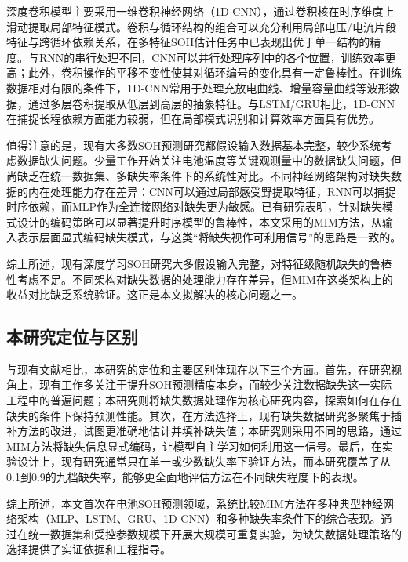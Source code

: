 \documentclass[10pt,a4paper]{ctexart}
\begin{document}
深度卷积模型主要采用一维卷积神经网络（1D-CNN），通过卷积核在时序维度上滑动提取局部特征模式\cite{zhang2024cnnsoh}。卷积与循环结构的组合可以充分利用局部电压/电流片段特征与跨循环依赖关系，在多特征SOH估计任务中已表现出优于单一结构的精度\cite{zhang2024cnnsoh}。与RNN的串行处理不同，CNN可以并行处理序列中的各个位置，训练效率更高；此外，卷积操作的平移不变性使其对循环编号的变化具有一定鲁棒性。在训练数据相对有限的条件下，1D-CNN常用于处理充放电曲线、增量容量曲线等波形数据，通过多层卷积提取从低层到高层的抽象特征。与LSTM/GRU相比，1D-CNN在捕捉长程依赖方面能力较弱，但在局部模式识别和计算效率方面具有优势。

值得注意的是，现有大多数SOH预测研究都假设输入数据基本完整，较少系统考虑数据缺失问题\cite{shao2025soh,deng2025novel}。少量工作开始关注电池温度等关键观测量中的数据缺失问题，但尚缺乏在统一数据集、多缺失率条件下的系统性对比\cite{shao2025soh}。不同神经网络架构对缺失数据的内在处理能力存在差异：CNN可以通过局部感受野提取特征，RNN可以捕捉时序依赖，而MLP作为全连接网络对缺失更为敏感。已有研究表明，针对缺失模式设计的编码策略可以显著提升时序模型的鲁棒性\cite{che2018recurrent}，本文采用的MIM方法，从输入表示层面显式编码缺失模式，与这类“将缺失视作可利用信号”的思路是一致的。

综上所述，现有深度学习SOH研究大多假设输入完整，对特征级随机缺失的鲁棒性考虑不足。不同架构对缺失数据的处理能力存在差异，但MIM在这类架构上的收益对比缺乏系统验证。这正是本文拟解决的核心问题之一。

\subsection{本研究定位与区别}

与现有文献相比，本研究的定位和主要区别体现在以下三个方面。首先，在研究视角上，现有工作多关注于提升SOH预测精度本身，而较少关注数据缺失这一实际工程中的普遍问题；本研究则将缺失数据处理作为核心研究内容，探索如何在存在缺失的条件下保持预测性能。其次，在方法选择上，现有缺失数据研究多聚焦于插补方法的改进，试图更准确地估计并填补缺失值；本研究则采用不同的思路，通过MIM方法将缺失信息显式编码，让模型自主学习如何利用这一信号。最后，在实验设计上，现有研究通常只在单一或少数缺失率下验证方法，而本研究覆盖了从0.1到0.9的九档缺失率，能够更全面地评估方法在不同缺失程度下的表现。

综上所述，本文首次在电池SOH预测领域，系统比较MIM方法在多种典型神经网络架构（MLP、LSTM、GRU、1D-CNN）和多种缺失率条件下的综合表现。通过在统一数据集和受控参数规模下开展大规模可重复实验，为缺失数据处理策略的选择提供了实证依据和工程指导。

\end{document}
